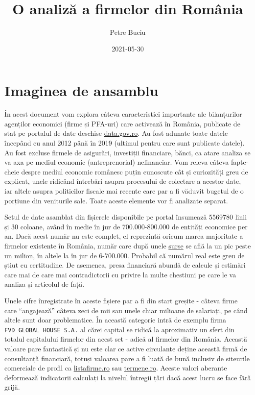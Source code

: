 \documentclass[
]{book}
\title{O analiză a firmelor din România}
\author{Petre Buciu}
\date{2021-05-30}
\begin{document}
\maketitle

{
\setcounter{tocdepth}{1}
\tableofcontents
}
\hypertarget{imaginea-de-ansamblu}{%
\chapter{Imaginea de ansamblu}\label{imaginea-de-ansamblu}}

În acest document vom explora câteva caracteristici importante ale bilanțurilor agenților economici (firme și PFA-uri) care activează în România, publicate de stat pe portalul de date deschise \href{\%22https://data.gov.ro/dataset?q=situatii+financiare\%22}{data.gov.ro}. Au fost adunate toate datele începând cu anul 2012 până în 2019 (ultimul pentru care sunt publicate datele). Au fost excluse firmele de asigurări, investiții financiare, bănci, ca atare analiza se va axa pe mediul economic (antreprenorial) nefinanciar. Vom releva câteva fapte-cheie despre mediul economic românesc puțin cunoscute cât și curiozități greu de explicat, unele ridicând întrebări asupra procesului de colectare a acestor date, iar altele asupra politicilor fiscale mai recente care par a fi văduvit bugetul de o porțiune din veniturile sale. Toate aceste elemente vor fi analizate separat.

Setul de date asamblat din fișierele disponibile pe portal însumează 5569780 linii și 30 coloane, având în medie în jur de 700.000-800.000 de entități economice per an. Dacă acest număr nu este complet, el reprezintă oricum marea majoritate a firmelor existente în România, număr care după unele \href{\%22https://www.startupcafe.ro/afaceri/afaceri-romania-cel-mai-mic-numar-insolvente-instorie-record-entitati-active.htm\%22}{surse} se află la un pic peste un milion, în \href{\%22https://www.economica.net/studiu-keysfin-primele-700-de-companii-care-activeaza-in-romania-au-produs-45prc-din-cifra-de-afaceri-a-tuturor-firmelor-nefinanciare-locale_190953.html\%22}{altele} la în jur de 6-700.000. Probabil că numărul real este greu de știut cu certitudine. De asemenea, presa financiară abundă de calcule și estimări care mai de care mai contradictorii cu privire la multe chestiuni pe care le va analiza și articolul de față.

Unele cifre înregistrate în aceste fișiere par a fi din start greșite - câteva firme care ``angajează'' câteva zeci de mii sau unele chiar milioane de salariați, pe când altele sunt doar problematice. În această categorie intră de exemplu firma \texttt{FVD\ GLOBAL\ HOUSE\ S.A.} al cărei capital se ridică la aproximativ un sfert din totalul capitalului firmelor din acest set - adică al firmelor din România. Această valoare pare fantastică și nu este clar ce active circulante deține această firmă de consultanță financiară, totuși valoarea pare a fi luată de bună inclusiv de siteurile comerciale de profil ca \href{\%22https://www.listafirme.ro\%22}{listafirme.ro} sau \href{\%22https://www.termene.ro\%22}{termene.ro}. Aceste valori aberante deformează indicatorii calculați la nivelul întregii țări dacă acest lucru se face fără grijă.
\end{document}
